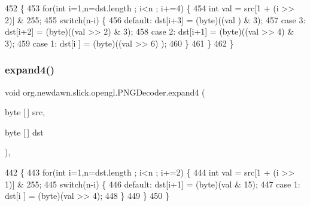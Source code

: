\begin{DoxyCode}
452                                                  \{
453         \textcolor{keywordflow}{for}(\textcolor{keywordtype}{int} i=1,n=dst.length ; i<n ; i+=4) \{
454             \textcolor{keywordtype}{int} val = src[1 + (i >> 2)] & 255;
455             \textcolor{keywordflow}{switch}(n-i) \{
456                 \textcolor{keywordflow}{default}: dst[i+3] = (byte)((val     ) & 3);
457                 \textcolor{keywordflow}{case} 3:  dst[i+2] = (byte)((val >> 2) & 3);
458                 \textcolor{keywordflow}{case} 2:  dst[i+1] = (byte)((val >> 4) & 3);
459                 \textcolor{keywordflow}{case} 1:  dst[i  ] = (byte)((val >> 6)    );
460             \}
461         \}
462     \}
\end{DoxyCode}
\mbox{\label{classorg_1_1newdawn_1_1slick_1_1opengl_1_1_p_n_g_decoder_a0ca84983943d5e90a184e0ac16833d4e}} 
\subsubsection{\texorpdfstring{expand4()}{expand4()}}
{\footnotesize\ttfamily void org.\+newdawn.\+slick.\+opengl.\+P\+N\+G\+Decoder.\+expand4 (\begin{DoxyParamCaption}\item[{byte \mbox{[}$\,$\mbox{]}}]{src,  }\item[{byte \mbox{[}$\,$\mbox{]}}]{dst }\end{DoxyParamCaption})\hspace{0.3cm}{\ttfamily [inline]}, {\ttfamily [private]}}


\begin{DoxyCode}
442                                                  \{
443         \textcolor{keywordflow}{for}(\textcolor{keywordtype}{int} i=1,n=dst.length ; i<n ; i+=2) \{
444             \textcolor{keywordtype}{int} val = src[1 + (i >> 1)] & 255;
445             \textcolor{keywordflow}{switch}(n-i) \{
446                 \textcolor{keywordflow}{default}: dst[i+1] = (byte)(val & 15);
447                 \textcolor{keywordflow}{case} 1:  dst[i  ] = (byte)(val >> 4);
448             \}
449         \}
450     \}
\end{DoxyCode}
\mbox{\label{classorg_1_1newdawn_1_1slick_1_1opengl_1_1_p_n_g_decoder_a1972b2918da3ba0701b1f3694ae31e60}} 

